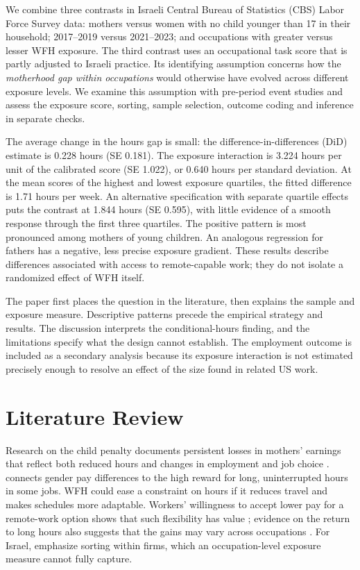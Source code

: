 \documentclass[12pt,a4paper]{article}
\begin{document}
We combine three contrasts in Israeli Central Bureau of Statistics (CBS) Labor Force Survey data: mothers versus women with no child younger than 17 in their household; 2017--2019 versus 2021--2023; and occupations with greater versus lesser WFH exposure. The third contrast uses an occupational task score that is partly adjusted to Israeli practice. Its identifying assumption concerns how the \emph{motherhood gap within occupations} would otherwise have evolved across different exposure levels. We examine this assumption with pre-period event studies and assess the exposure score, sorting, sample selection, outcome coding and inference in separate checks.

The average change in the hours gap is small: the difference-in-differences (DiD) estimate is 0.228 hours (SE 0.181). The exposure interaction is 3.224 hours per unit of the calibrated score (SE 1.022), or 0.640 hours per standard deviation. At the mean scores of the highest and lowest exposure quartiles, the fitted difference is 1.71 hours per week. An alternative specification with separate quartile effects puts the contrast at 1.844 hours (SE 0.595), with little evidence of a smooth response through the first three quartiles. The positive pattern is most pronounced among mothers of young children. An analogous regression for fathers has a negative, less precise exposure gradient. These results describe differences associated with access to remote-capable work; they do not isolate a randomized effect of WFH itself.

The paper first places the question in the literature, then explains the sample and exposure measure. Descriptive patterns precede the empirical strategy and results. The discussion interprets the conditional-hours finding, and the limitations specify what the design cannot establish. The employment outcome is included as a secondary analysis because its exposure interaction is not estimated precisely enough to resolve an effect of the size found in related US work.

\section{Literature Review}\label{sec:lit}
Research on the child penalty documents persistent losses in mothers' earnings that reflect both reduced hours and changes in employment and job choice \citep{kleven2019denmark,kleven2019countries}. \citet{goldin2014} connects gender pay differences to the high reward for long, uninterrupted hours in some jobs. WFH could ease a constraint on hours if it reduces travel and makes schedules more adaptable. Workers' willingness to accept lower pay for a remote-work option shows that such flexibility has value \citep{maspallais2017}; evidence on the return to long hours also suggests that the gains may vary across occupations \citep{cortespan2019}. For Israel, \citet{buzaglo2023} emphasize sorting within firms, which an occupation-level exposure measure cannot fully capture.
\end{document}
